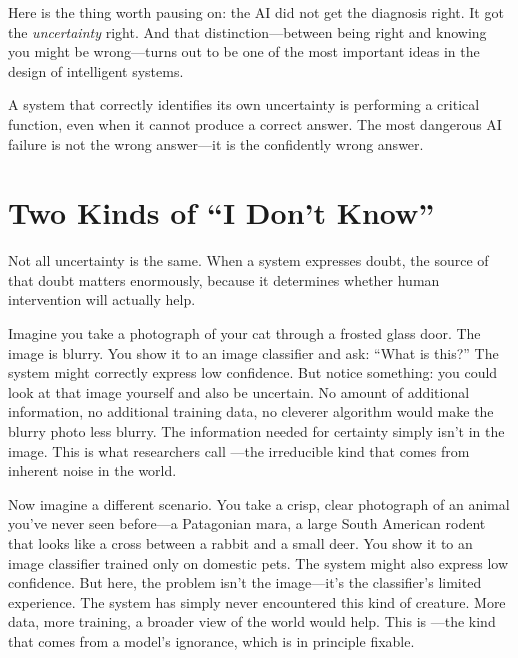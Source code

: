 Here is the thing worth pausing on: the AI did not get the diagnosis right. It got the \emph{uncertainty} right. And that distinction---between being right and knowing you might be wrong---turns out to be one of the most important ideas in the design of intelligent systems.

\begin{keyconcept}
A system that correctly identifies its own uncertainty is performing a critical function, even when it cannot produce a correct answer. The most dangerous AI failure is not the wrong answer---it is the confidently wrong answer.
\end{keyconcept}

\section{Two Kinds of ``I Don't Know''}
\label{sec:two-kinds-uncertainty}

Not all uncertainty is the same. When a system expresses doubt, the source of that doubt matters enormously, because it determines whether human intervention will actually help.

Imagine you take a photograph of your cat through a frosted glass door. The image is blurry. You show it to an image classifier and ask: ``What is this?'' The system might correctly express low confidence. But notice something: you could look at that image yourself and also be uncertain. No amount of additional information, no additional training data, no cleverer algorithm would make the blurry photo less blurry. The information needed for certainty simply isn't in the image. This is what researchers call ---the irreducible kind that comes from inherent noise in the world.

Now imagine a different scenario. You take a crisp, clear photograph of an animal you've never seen before---a Patagonian mara, a large South American rodent that looks like a cross between a rabbit and a small deer. You show it to an image classifier trained only on domestic pets. The system might also express low confidence. But here, the problem isn't the image---it's the classifier's limited experience. The system has simply never encountered this kind of creature. More data, more training, a broader view of the world would help. This is ---the kind that comes from a model's ignorance, which is in principle fixable.

